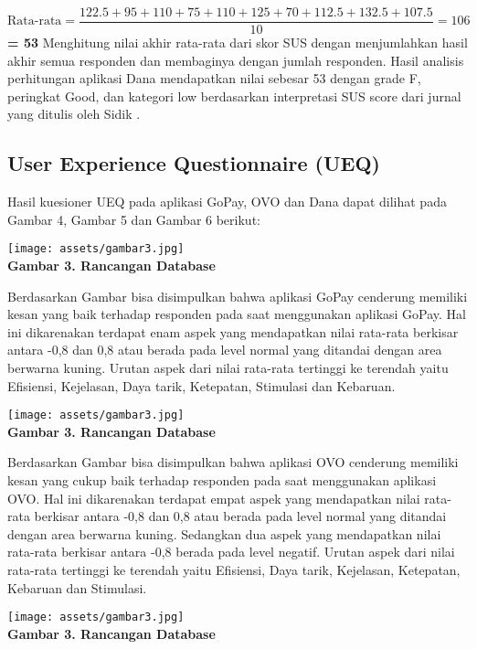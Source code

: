 \documentclass[
 manuscript=article,  %
  layout=publish, 
  year=2024, 
  month= Februari, %
  volume=8,
  number=1 
]{JIKO}
\begin{document}
\[
\text{Rata-rata} = \frac{122.5 + 95 + 110 + 75 + 110 + 125 + 70 + 112.5 + 132.5 + 107.5}{10} = 106
\]
\textbf{= 53}
Menghitung nilai akhir rata-rata dari skor SUS dengan menjumlahkan hasil akhir semua responden dan membaginya dengan jumlah responden. Hasil analisis perhitungan aplikasi Dana mendapatkan nilai sebesar 53 dengan grade F, peringkat Good, dan kategori low berdasarkan interpretasi SUS score dari jurnal yang ditulis oleh Sidik \cite{9}.


\subsection{User Experience Questionnaire (UEQ)}
Hasil kuesioner UEQ pada aplikasi GoPay, OVO dan Dana dapat dilihat pada Gambar 4, Gambar 5 dan Gambar 6 berikut:
\begin{center}
    \texttt{[image: assets/gambar3.jpg]}
    \\\textbf{Gambar 3. Rancangan Database}
\end{center}



Berdasarkan Gambar  bisa disimpulkan bahwa aplikasi GoPay cenderung memiliki kesan yang baik terhadap responden pada saat menggunakan aplikasi GoPay. Hal ini dikarenakan terdapat enam aspek yang mendapatkan nilai rata-rata berkisar antara -0,8 dan 0,8 atau berada pada level normal yang ditandai dengan area berwarna kuning. Urutan aspek dari nilai rata-rata tertinggi ke terendah yaitu Efisiensi, Kejelasan, Daya tarik, Ketepatan, Stimulasi dan Kebaruan.
\begin{center}
    \texttt{[image: assets/gambar3.jpg]}
    \\\textbf{Gambar 3. Rancangan Database}
\end{center}

Berdasarkan Gambar  bisa disimpulkan bahwa aplikasi OVO cenderung memiliki kesan yang cukup baik terhadap responden pada saat menggunakan aplikasi OVO. Hal ini dikarenakan terdapat empat aspek yang mendapatkan nilai rata-rata berkisar antara -0,8 dan 0,8 atau berada pada level normal yang ditandai dengan area berwarna kuning. Sedangkan dua aspek yang mendapatkan nilai rata-rata berkisar antara -0,8 berada pada level negatif. Urutan aspek dari nilai rata-rata tertinggi ke terendah yaitu Efisiensi, Daya tarik, Kejelasan, Ketepatan, Kebaruan dan Stimulasi. 
\begin{center}
    \texttt{[image: assets/gambar3.jpg]}
    \\\textbf{Gambar 3. Rancangan Database}
\end{center}
\end{document}
